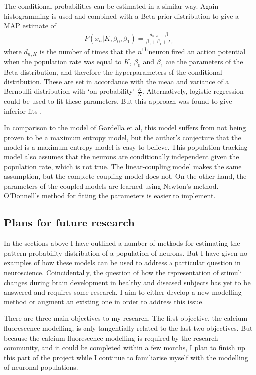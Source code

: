 \documentclass[a4paper,12pt]{article}
\theoremstyle{definition}
\newcommand{\upperth}{$^{\mbox{\footnotesize{th}}}$}%
\begin{document}
	The conditional probabilities can be estimated in a similar way. Again histogramming is used and combined with a Beta prior distribution to give a MAP estimate of
	\begin{align}
	P(x_n | K, \beta_0, \beta_1) = \frac{d_{n,K} + \beta_1}{\beta_0 + \beta_1 + T_K}
	\end{align}
	where $d_{n,K}$ is the number of times that the $n$\upperth neuron fired an action potential when the population rate was equal to $K$, $\beta_0$ and $\beta_1$ are the parameters of the Beta distribution, and therefore the hyperparameters of the conditional distribution. These are set in accordance with the mean and variance of a Bernoulli distribution with `on-probability' $\frac{K}{N}$. Alternatively, logistic regression could be used to fit these parameters. But this approach was found to give inferior fits \cite{odonnell}.
	
	In comparison to the model of Gardella et al, this model suffers from not being proven to be a maximum entropy model, but the author's conjecture that the model is a maximum entropy model is easy to believe. This population tracking model also assumes that the neurons are conditionally independent given the population rate, which is not true. The linear-coupling model makes the same assumption, but the complete-coupling model does not. On the other hand, the parameters of the coupled models are learned using Newton's method. O'Donnell's method for fitting the parameters is easier to implement. 
	
		
\subsection{Plans for future research}
	In the sections above I have outlined a number of methods for estimating the pattern probability distribution of a population of neurons. But I have given no examples of how these models can be used to address a particular question in neuroscience. Coincidentally, the question of how the representation of stimuli changes during brain development in healthy and diseased subjects has yet to be answered and requires some research. I aim to either develop a new modelling method or augment an existing one in order to address this issue.

	There are three main objectives to my research. The first objective, the calcium fluorescence modelling, is only tangentially related to the last two objectives. But because the calcium fluorescence modelling is required by the research community, and it could be completed within a few months, I plan to finish up this part of the project while I continue to familiarise myself with the modelling of neuronal populations.
	
\end{document}
